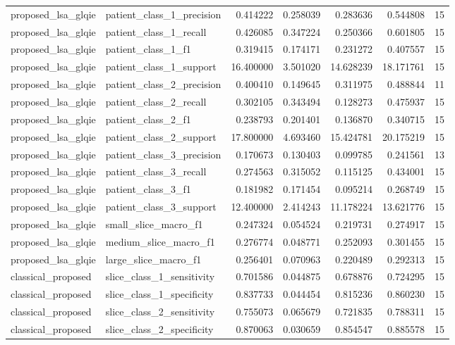 \begin{tabular}{llrrrrr}
proposed_lsa_glqie & patient_class_1_precision & 0.414222 & 0.258039 & 0.283636 & 0.544808 & 15 \\
proposed_lsa_glqie & patient_class_1_recall & 0.426085 & 0.347224 & 0.250366 & 0.601805 & 15 \\
proposed_lsa_glqie & patient_class_1_f1 & 0.319415 & 0.174171 & 0.231272 & 0.407557 & 15 \\
proposed_lsa_glqie & patient_class_1_support & 16.400000 & 3.501020 & 14.628239 & 18.171761 & 15 \\
proposed_lsa_glqie & patient_class_2_precision & 0.400410 & 0.149645 & 0.311975 & 0.488844 & 11 \\
proposed_lsa_glqie & patient_class_2_recall & 0.302105 & 0.343494 & 0.128273 & 0.475937 & 15 \\
proposed_lsa_glqie & patient_class_2_f1 & 0.238793 & 0.201401 & 0.136870 & 0.340715 & 15 \\
proposed_lsa_glqie & patient_class_2_support & 17.800000 & 4.693460 & 15.424781 & 20.175219 & 15 \\
proposed_lsa_glqie & patient_class_3_precision & 0.170673 & 0.130403 & 0.099785 & 0.241561 & 13 \\
proposed_lsa_glqie & patient_class_3_recall & 0.274563 & 0.315052 & 0.115125 & 0.434001 & 15 \\
proposed_lsa_glqie & patient_class_3_f1 & 0.181982 & 0.171454 & 0.095214 & 0.268749 & 15 \\
proposed_lsa_glqie & patient_class_3_support & 12.400000 & 2.414243 & 11.178224 & 13.621776 & 15 \\
proposed_lsa_glqie & small_slice_macro_f1 & 0.247324 & 0.054524 & 0.219731 & 0.274917 & 15 \\
proposed_lsa_glqie & medium_slice_macro_f1 & 0.276774 & 0.048771 & 0.252093 & 0.301455 & 15 \\
proposed_lsa_glqie & large_slice_macro_f1 & 0.256401 & 0.070963 & 0.220489 & 0.292313 & 15 \\
classical_proposed & slice_class_1_sensitivity & 0.701586 & 0.044875 & 0.678876 & 0.724295 & 15 \\
classical_proposed & slice_class_1_specificity & 0.837733 & 0.044454 & 0.815236 & 0.860230 & 15 \\
classical_proposed & slice_class_2_sensitivity & 0.755073 & 0.065679 & 0.721835 & 0.788311 & 15 \\
classical_proposed & slice_class_2_specificity & 0.870063 & 0.030659 & 0.854547 & 0.885578 & 15 \\

\end{tabular}
